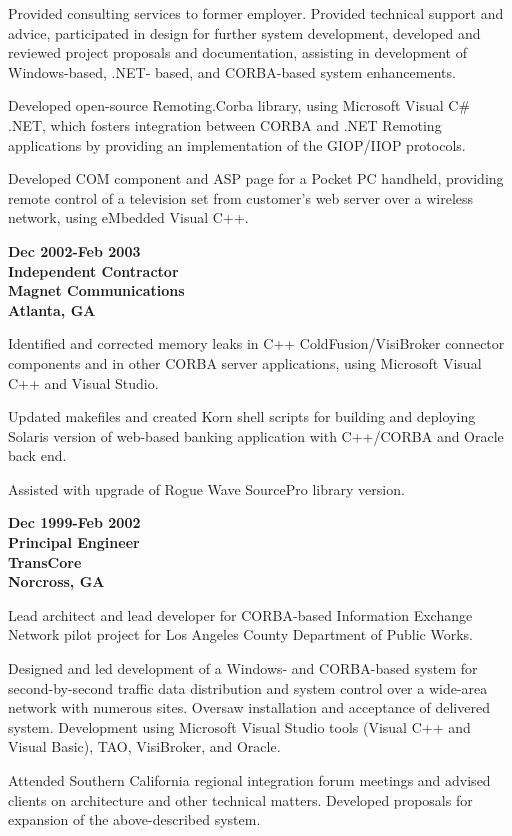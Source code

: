 Provided consulting services to former employer. Provided technical
support and advice, participated in design for further system
development, developed and reviewed project proposals and documentation,
assisting in development of Windows-based, .NET- based, and CORBA-based
system enhancements.

Developed open-source Remoting.Corba library, using Microsoft Visual C\#
.NET, which fosters integration between CORBA and .NET Remoting
applications by providing an implementation of the GIOP/IIOP protocols.

Developed COM component and ASP page for a Pocket PC handheld, providing
remote control of a television set from customer's web server over a
wireless network, using eMbedded Visual C++.

\textbf{Dec 2002-Feb 2003\\
Independent Contractor\\
Magnet Communications\\
Atlanta, GA}

Identified and corrected memory leaks in C++ ColdFusion/VisiBroker
connector components and in other CORBA server applications, using
Microsoft Visual C++ and Visual Studio.

Updated makefiles and created Korn shell scripts for building and
deploying Solaris version of web-based banking application with
C++/CORBA and Oracle back end.

Assisted with upgrade of Rogue Wave SourcePro library version.

\textbf{Dec 1999-Feb 2002\\
Principal Engineer\\
TransCore\\
Norcross, GA}

Lead architect and lead developer for CORBA-based Information Exchange
Network pilot project for Los Angeles County Department of Public Works.

Designed and led development of a Windows- and CORBA-based system for
second-by-second traffic data distribution and system control over a
wide-area network with numerous sites. Oversaw installation and
acceptance of delivered system. Development using Microsoft Visual
Studio tools (Visual C++ and Visual Basic), TAO, VisiBroker, and Oracle.

Attended Southern California regional integration forum meetings and
advised clients on architecture and other technical matters. Developed
proposals for expansion of the above-described system.

